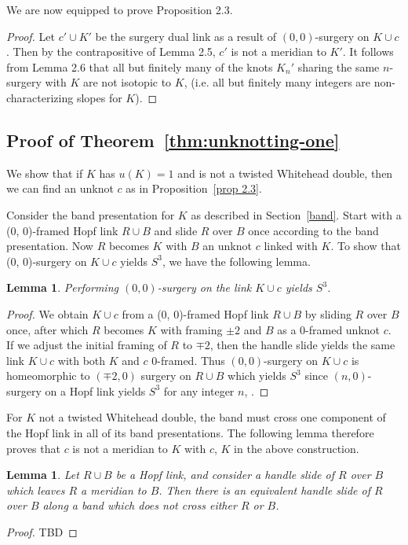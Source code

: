 \documentclass[11pt,usenames,dvipsnames,reqno]{amsart}
\numberwithin{theorem}{section}
\newtheorem{lemma}[theorem]{Lemma}
\theoremstyle{ex}
\theoremstyle{rem}
\begin{document}
We are now equipped to prove Proposition 2.3. 

\begin{proof}
Let $c' \cup K'$ be the surgery dual link as a result of $(0, 0)$-surgery on $K \cup c$. Then by the contrapositive of Lemma 2.5, $c'$ is not a meridian to $K'$. It follows from Lemma 2.6 that all but finitely many of the knots $K_n'$ sharing the same $n$-surgery with $K$ are not isotopic to $K$, (i.e. all but finitely many integers are non-characterizing slopes for $K$).
\end{proof}


\subsection{Proof of Theorem~\ref{thm:unknotting-one}} We show that if $K$ has $u(K)=1$ and is not a twisted Whitehead double, then we can find an unknot $c$ as in Proposition~\ref{prop 2.3}. 

Consider the band presentation for $K$ as described in Section~\ref{band}. Start with a (0, 0)-framed Hopf link $R\cup B$ and slide $R$ over $B$ once according to the band presentation. Now $R$ becomes $K$ with $B$ an unknot $c$ linked with $K$. To show that (0, 0)-surgery on $K\cup c$ yields $S^3$, we have the following lemma. 

\begin{lemma}
	Performing $(0,0)$-surgery on the link $K\cup c$ yields $S^3$.
\end{lemma}

\begin{proof}
	We obtain $K\cup c$ from a (0, 0)-framed Hopf link $R \cup B$ by sliding $R$ over $B$ once, after which $R$ becomes $K$ with framing $\pm 2$ and $B$ as a 0-framed unknot $c$. If we adjust the initial framing of $R$ to $\mp 2$, then the handle slide yields the same link $K\cup c$ with both $K$ and $c$ 0-framed. Thus $(0,0)$-surgery on $K\cup c$ is homeomorphic to $(\mp 2,0)$ surgery on $R\cup B$ which yields $S^3$ since $(n,0)$-surgery on a Hopf link yields $S^3$ for any integer $n$, .
\end{proof}

For $K$ not a twisted Whitehead double, the band must cross one component of the Hopf link in all of its band presentations. The following lemma therefore proves that $c$ is not a meridian to $K$ with $c$, $K$ in the above construction.

\begin{lemma}
	Let $R\cup B$ be a Hopf link, and consider a handle slide of $R$ over $B$ which leaves $R$ a meridian to $B$. Then there is an equivalent handle slide of $R$ over $B$ along a band which does not cross either $R$ or $B$.
\end{lemma}
\begin{proof}
	TBD
\end{proof}
\end{document}
